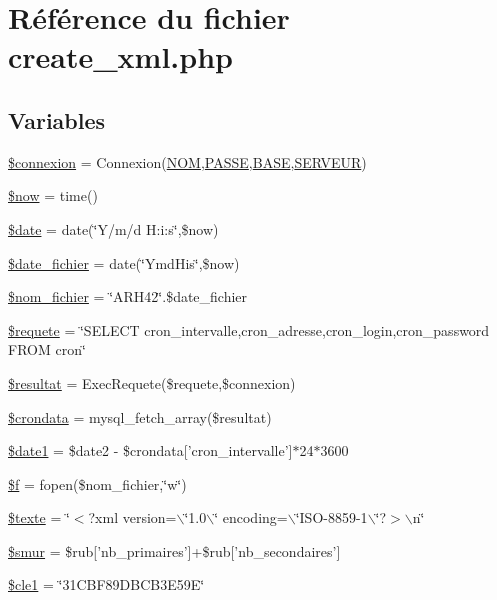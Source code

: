 \hypertarget{create__xml_8php}{
\section{R\'{e}f\'{e}rence du fichier create\_\-xml.php}
\label{create__xml_8php}
}
\subsection*{Variables}
\begin{CompactItemize}
\item 
\hyperlink{create__xml_8php_a0}{\$connexion} = Connexion(\hyperlink{pma__connect_8php_a0}{NOM},\hyperlink{pma__connect_8php_a1}{PASSE},\hyperlink{pma__connect_8php_a3}{BASE},\hyperlink{pma__connect_8php_a2}{SERVEUR})
\item 
\hyperlink{create__xml_8php_a1}{\$now} = time()
\item 
\hyperlink{create__xml_8php_a2}{\$date} = date(\char`\"{}Y/m/d H:i:s\char`\"{},\$now)
\item 
\hyperlink{create__xml_8php_a3}{\$date\_\-fichier} = date(\char`\"{}Ymd\-His\char`\"{},\$now)
\item 
\hyperlink{create__xml_8php_a4}{\$nom\_\-fichier} = \char`\"{}ARH42\char`\"{}.\$date\_\-fichier
\item 
\hyperlink{create__xml_8php_a5}{\$requete} = \char`\"{}SELECT cron\_\-intervalle,cron\_\-adresse,cron\_\-login,cron\_\-password FROM cron\char`\"{}
\item 
\hyperlink{create__xml_8php_a6}{\$resultat} = Exec\-Requete(\$requete,\$connexion)
\item 
\hyperlink{create__xml_8php_a7}{\$crondata} = mysql\_\-fetch\_\-array(\$resultat)
\item 
\hyperlink{create__xml_8php_a8}{\$date1} = \$date2 - \$crondata\mbox{[}'cron\_\-intervalle'\mbox{]}$\ast$24$\ast$3600
\item 
\hyperlink{create__xml_8php_a9}{\$f} = fopen(\$nom\_\-fichier,\char`\"{}w\char`\"{})
\item 
\hyperlink{create__xml_8php_a10}{\$texte} = \char`\"{}$<$?xml version=$\backslash$\char`\"{}1.0$\backslash$\char`\"{} encoding=$\backslash$\char`\"{}ISO-8859-1$\backslash$\char`\"{}?$>$$\backslash$n\char`\"{}
\item 
\hyperlink{create__xml_8php_a11}{\$smur} = \$rub\mbox{[}'nb\_\-primaires'\mbox{]}+\$rub\mbox{[}'nb\_\-secondaires'\mbox{]}
\item 
\hyperlink{create__xml_8php_a12}{\$cle1} = \char`\"{}31CBF89DBCB3E59E\char`\"{}
$$
\end{CompactItemize}
